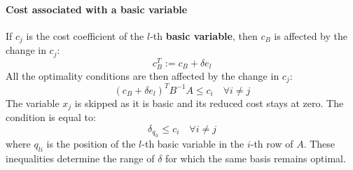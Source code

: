 \paragraph*{Cost associated with a basic variable}
If $c_j$ is the cost coefficient of the $l$-th \textbf{basic variable}, then $c_B$ is affected by the change in $c_j$:
\[ c^T_B := c_B + \delta  e_l \]
All the optimality conditions are then affected by the change in $c_j$:
\[ \left( c_B + \delta e_l \right)^T B^{-1} A \leq c_i \quad \forall i \neq j \]
The variable $x_j$ is skipped as it is basic and its reduced cost stays at zero.
The condition is equal to:
\[ \delta_{q_{li}} \leq c_i \quad \forall i \neq j \]
where $q_{li}$ is the position of the $l$-th basic variable in the $i$-th row of $A$.
These inequalities determine the range of $\delta$ for which the same basis remains optimal.